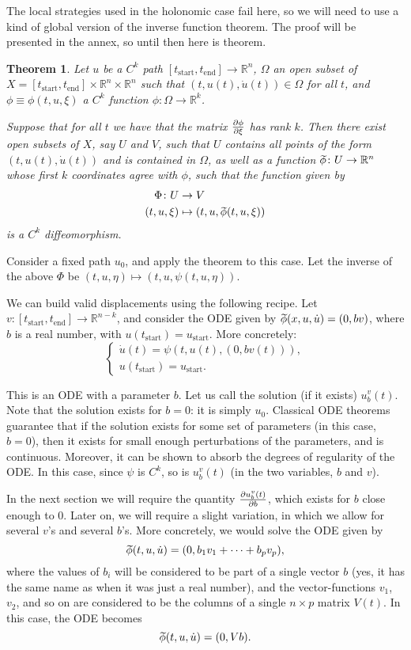 \documentclass{article}
\newtheorem{theorem}{Theorem}
\theoremstyle{plain}
\theoremstyle{nonumberplain}
\newcommand{\R}{\mathbb{R}}
\newcommand{\tstart}{\mathrm{start}}
\newcommand{\tend}{\mathrm{end}}
\newcommand{\wtphi}{
  \mspace{2mu}
  \widetilde{\mspace{-2mu}\smash[t]{\phi}}
}
\begin{document}
The local strategies used in the holonomic case fail here, so we will need to use a kind of global version of the inverse function theorem. The proof will be presented in the annex, so until then here is theorem.

\begin{theorem}
Let $u$ be a $C^k$ path $[t_\tstart,t_\tend] \to \R^n$, $\Omega$ an open subset of $X = [t_\tstart,t_\tend] \times \R^n \times \R^n$ such that $(t,u(t),\dot u(t)) \in \Omega$ for all $t$, and $\phi \equiv \phi(t,u,\xi)$ a $C^k$ function $\phi \colon \Omega \to \R^k$.

Suppose that for all $t$ we have that the matrix $\diffp\phi\xi$ has rank $k$. Then there exist open subsets of $X$, say $U$ and $V$, such that $U$ contains all points of the form $(t,u(t),\dot u(t))$ and is contained in $\Omega$, as well as a function $\wtphi \colon U \to \R^n$ whose first $k$ coordinates agree with $\phi$, such that the function given by
\begin{align*}
\Phi \colon U &\to V\\
(t,u,\xi) &\mapsto (t,u,\wtphi(t,u,\xi))
\end{align*}
is a $C^k$ diffeomorphism.
\end{theorem}

Consider a fixed path $u_0$, and apply the theorem to this case. Let the inverse of the above $\Phi$ be $(t,u,\eta) \mapsto (t,u,\psi(t,u,\eta))$.

We can build valid displacements using the following recipe. Let $v \colon [t_\tstart, t_\tend] \to \R^{n-k}$, and consider the ODE given by $\wtphi(x,u,\dot u) = (0, b v)$, where $b$ is a real number, with $u(t_\tstart) = u_\tstart$. More concretely:
\[
\begin{cases}
\dot u(t) = \psi(t, u(t), (0, b v(t))),\\
u(t_\tstart) = u_\tstart.
\end{cases}
\]

This is an ODE with a parameter $b$. Let us call the solution (if it exists) $u_b^v(t)$. Note that the solution exists for $b = 0$: it is simply $u_0$. Classical ODE theorems guarantee that if the solution exists for some set of parameters (in this case, $b = 0$), then it exists for small enough perturbations of the parameters, and is continuous. Moreover, it can be shown to absorb the degrees of regularity of the ODE. In this case, since $\psi$ is $C^k$, so is $u_b^v(t)$ (in the two variables, $b$ and $v$).

In the next section we will require the quantity $\diffp{u_b^v(t)}b$, which exists for $b$ close enough to 0. Later on, we will require a slight variation, in which we allow for several $v$'s and several $b$'s. More concretely, we would solve the ODE given by
\[\wtphi(t,u,\dot u) = (0, b_1 v_1 + \dots + b_p v_p),\]
where the values of $b_i$ will be considered to be part of a single vector $b$ (yes, it has the same name as when it was just a real number), and the vector-functions $v_1$, $v_2$, and so on are considered to be the columns of a single $n \times p$ matrix $V(t)$. In this case, the ODE becomes
\[\wtphi(t,u,\dot u) = (0, V b).\]
\end{document}
